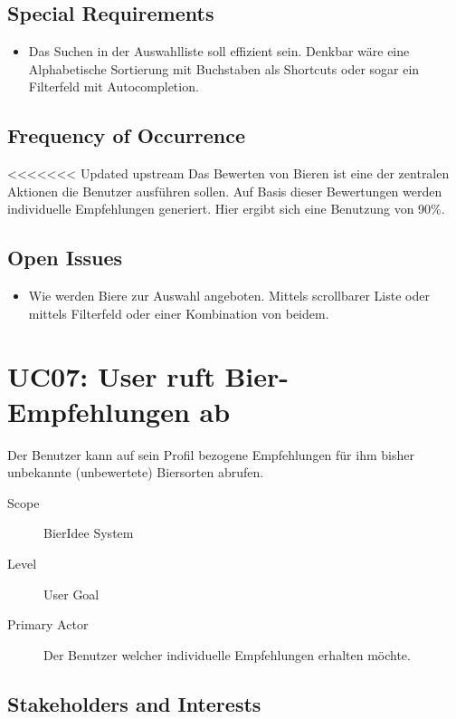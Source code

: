 \documentclass[10pt,a4paper]{scrartcl}
\begin{document}
\subsection*{Special Requirements}

\begin{itemize}
\item Das Suchen in der Auswahlliste soll effizient sein. Denkbar wäre eine Alphabetische Sortierung mit Buchstaben als Shortcuts oder sogar ein Filterfeld mit Autocompletion.
\end{itemize}


\subsection*{Frequency of Occurrence}

<<<<<<< Updated upstream
Das Bewerten von Bieren ist eine der zentralen Aktionen die Benutzer ausführen sollen.
Auf Basis dieser Bewertungen werden individuelle Empfehlungen generiert. Hier ergibt sich eine Benutzung von 90\%.

\subsection*{Open Issues}

\begin{itemize}
\item Wie werden Biere zur Auswahl angeboten. Mittels scrollbarer Liste oder mittels Filterfeld oder einer Kombination von beidem.
\end{itemize}



\section*{UC07: User ruft Bier-Empfehlungen ab}
Der Benutzer kann auf sein Profil bezogene Empfehlungen für ihm bisher unbekannte (unbewertete) Biersorten abrufen.

\begin{description}
\item[Scope] BierIdee System
\item[Level] User Goal
\item[Primary Actor] Der Benutzer welcher individuelle Empfehlungen erhalten möchte.
\end{description}


\subsection*{Stakeholders and Interests}
\end{document}
